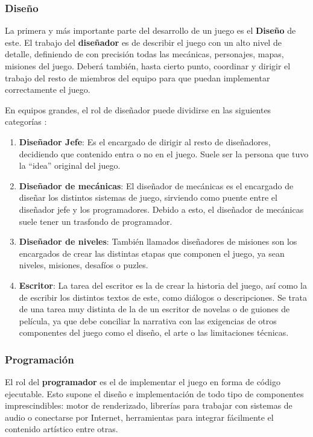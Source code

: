 \subsubsection{Diseño}
La primera y más importante parte del desarrollo de un juego es el \textbf{Diseño} de este. El trabajo del \textbf{diseñador} es de describir el juego con un alto nivel de detalle, definiendo de con precisión todas las mecánicas, personajes, mapas, misiones del juego. Deberá también, hasta cierto punto, coordinar y dirigir el trabajo del resto de miembros del equipo para que puedan implementar correctamente el juego. 

En equipos grandes, el rol de diseñador puede dividirse en las siguientes categorías \cite{development_and_production}:
\begin{enumerate}
\item \textbf{Diseñador Jefe}: Es el encargado de dirigir al resto de diseñadores, decidiendo que contenido entra o no en el juego. Suele ser la persona que tuvo la ``idea'' original del juego.
\item \textbf{Diseñador de mecánicas}: El diseñador de mecánicas es el encargado de diseñar los distintos sistemas de juego, sirviendo como puente entre el diseñador jefe y los programadores. Debido a esto, el diseñador de mecánicas suele tener un trasfondo de programador.
\item \textbf{Diseñador de niveles}: También llamados diseñadores de misiones son los encargados de crear las distintas etapas que componen el juego, ya sean niveles, misiones, desafíos o puzles.
\item \textbf{Escritor}: La tarea del escritor es la de crear la historia del juego, así como la de escribir los distintos textos de este, como diálogos o descripciones. Se trata de una tarea muy distinta de la de un escritor de novelas o de guiones de película, ya que debe conciliar la narrativa con las exigencias de otros componentes del juego como el diseño, el arte o las limitaciones técnicas.
\end{enumerate}

\subsubsection{Programación}
El rol del \textbf{programador} es el de implementar el juego en forma de código ejecutable. Esto supone el diseño e implementación de todo tipo de componentes imprescindibles: motor de renderizado, librerías para trabajar con sistemas de audio o conectarse por Internet, herramientas para integrar fácilmente el contenido artístico entre otras.

